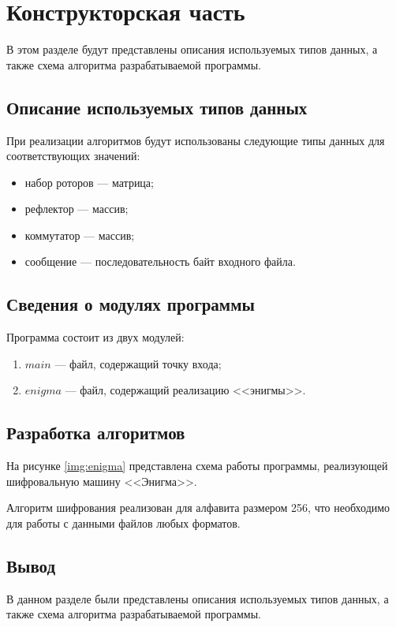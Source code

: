 \chapter{Конструкторская часть}
В этом разделе будут представлены описания используемых типов данных, а также схема алгоритма разрабатываемой программы.

\section{Описание используемых типов данных}

При реализации алгоритмов будут использованы следующие типы данных для соответствующих значений:
\begin{itemize}[label=---]
	\item набор роторов --- матрица;
	\item рефлектор --- массив;
    \item коммутатор --- массив;
	\item сообщение --- последовательность байт входного файла.
\end{itemize}

\section{Сведения о модулях программы}
Программа состоит из двух модулей:
\begin{enumerate}[label=\arabic*)]
    \item $main$ --- файл, содержащий точку входа;
    \item $enigma$ --- файл, содержащий реализацию <<энигмы>>.
\end{enumerate}

\section{Разработка алгоритмов}
На рисунке \ref{img:enigma} представлена схема работы программы, реализующей шифровальную машину <<Энигма>>.

\FloatBarrier

Алгоритм шифрования реализован для  алфавита размером 256, что необходимо для работы с данными файлов любых форматов.

\section*{Вывод}

В данном разделе были представлены описания используемых типов данных, а также схема алгоритма разрабатываемой программы.

